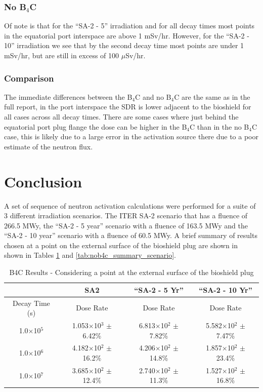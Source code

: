 \documentclass[12pt]{article}
\begin{document}
\subsubsection*{No B$_4$C}
Of note is that for the ``SA-2 - 5'' irradiation and for all decay 
times most points in the equatorial port interspace are above 1 mSv/hr. However,
for the ``SA-2 - 10'' irradiation we see that by the second decay time most points 
are under 1 mSv/hr, but are still in excess of 100 $\mu$Sv/hr. 
\subsubsection*{Comparison}
The immediate differences between the B$_4$C and no B$_4$C are the same as in 
the full report, in the port interspace the SDR is lower adjacent to the 
bioshield for all cases across all decay times. There are some cases where
just behind the equatorial port plug flange the dose can be higher in the 
B$_4$C than in the no B$_4$C case, this is likely due to a large error in the 
activation source there due to a poor estimate of the neutron flux. 
\clearpage
\newpage
\section{Conclusion}
A set of sequence of neutron activation calculations were performed for a suite 
of 3 different irradiation scenarios. The ITER SA-2 scenario that has a
fluence of 266.5 MWy, the ``SA-2 - 5 year'' scenario with a fluence of 163.5 MWy and
the ``SA-2 - 10 year'' scenario with a fluence of 60.5 MWy. A brief summary of
results chosen at a point on the external surface of the bioshield plug are shown in
shown in Tables \ref{tab:b4c_summary_scenario} and \ref{tab:nob4c_summary_scenario}.

\begin{table}[ht!]
   \centering      
   \begin{tabular}{| c | c | c | c |}
      \hline
      & SA2 & ``SA-2 - 5 Yr'' & ``SA-2 - 10 Yr'' \\
      \hline
      Decay Time (s) & Dose Rate & Dose Rate & Dose Rate \\
      \hline
      1.0$\times$10$^{5}$ & 1.053$\times$10$^{3}$ $\pm$ 6.42\% & 6.813$\times$10$^{2}$ $\pm$ 7.82\% & 5.582$\times$10$^{2}$ $\pm$ 7.47\%\\
      1.0$\times$10$^{6}$ & 4.182$\times$10$^{2}$ $\pm$ 16.2\% & 4.206$\times$10$^{2}$ $\pm$ 14.8\% & 1.857$\times$10$^{2}$ $\pm$ 23.4\%\\
      1.0$\times$10$^{7}$ & 3.685$\times$10$^{2}$ $\pm$ 12.4\% & 2.740$\times$10$^{2}$ $\pm$ 11.3\% & 1.527$\times$10$^{2}$ $\pm$ 16.8\%\\
      \hline
\end{tabular}
\caption{B4C Results - Considering a point at the external surface of the bioshield plug}
\label{tab:b4c_summary_scenario}
\end{table}
\end{document}
